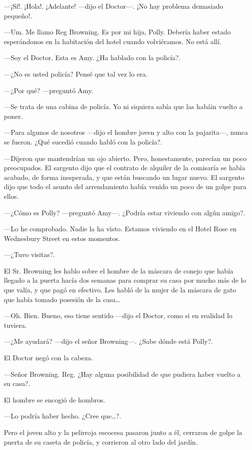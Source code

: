---¡Sí!. ¡Hola!. ¡Adelante! ---dijo el Doctor---. ¡No hay problema demasiado pequeño!.

---Um. Me llamo Reg Browning. Es por mi hija, Polly. Debería haber estado esperándonos en la habitación del hotel cuando volviéramos. No está allí.

---Soy el Doctor. Esta es Amy. ¿Ha hablado con la policía?.

---¿No es usted policía? Pensé que tal vez lo era.

---¿Por qué? ---preguntó Amy.

---Se trata de una cabina de policía. Yo ni siquiera sabía que las habáin vuelto a poner.

---Para algunos de nosotros ---dijo el hombre joven y alto con la pajarita---, nunca se fueron. ¿Qué sucedió cuando habló con la policía?.

---Dijeron que mantendrían un ojo abierto. Pero, honestamente, parecían un poco preocupados. El sargento dijo que el contrato de alquiler de la comisaría se había acabado, de forma inesperada, y que están buscando un lugar nuevo. El sargento dijo que todo el asunto del arrendamiento había venido un poco de un golpe para ellos.

---¿Cómo es Polly? ---preguntó Amy---. ¿Podría estar viviendo con algún amigo?.

---Lo he comprobado. Nadie la ha visto. Estamos viviendo en el Hotel Rose en Wednesbury Street en estos momentos.

---¿Tuvo visitas?.

El Sr. Browning les hablo sobre el hombre de la máscara de conejo que había llegado a la puerta hacía dos semanas para comprar su casa por mucho más de lo que valía, y que pagó en efectivo. Les habló de la mujer de la máscara de gato que había tomado posesión de la casa\ldots{}

---Oh. Bien. Bueno, eso tiene sentido ---dijo el Doctor, como si en realidad lo tuviera.

---¿Me ayudará? ---dijo el señor Browning---. ¿Sabe dónde está Polly?.

El Doctor negó con la cabeza.

---Señor Browning. Reg. ¿Hay alguna posibilidad de que pudiera haber vuelto a su casa?.

El hombre se encogió de hombros.

---Lo podría haber hecho. ¿Cree que\ldots{}?.

Pero el joven alto y la pelirroja escocesa pasaron junto a él, cerraron de golpe la puerta de su caseta de policía, y corrieron al otro lado del jardín.

